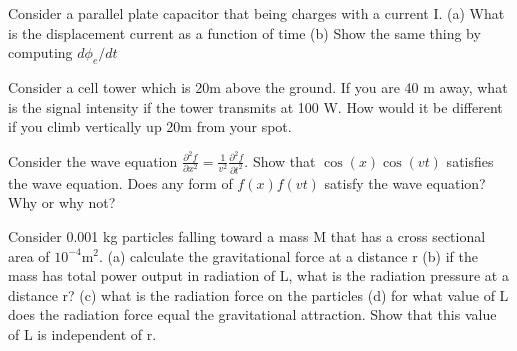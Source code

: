 \documentclass[12pt]{article}
\begin{document}
\pagestyle{empty}

\noindent Consider a parallel plate capacitor that being charges with a current I.  (a) What is the displacement current as a function of time (b) Show the same thing by computing $d\phi_e/dt$
\newpage

\noindent Consider a cell tower which is 20m above the ground.  If you are 40 m away, what is the signal intensity if the tower transmits at 100 W.  How would it be different if you climb vertically up 20m from your spot. 
\newpage

\noindent Consider the wave equation $\frac{\partial^2 f}{\partial x^2} = \frac 1 {v^2} \frac{\partial^2 f}{\partial t^2}$.  Show that $\cos(x)\cos(vt)$ satisfies the wave equation.  Does any form of $f(x)f(vt)$ satisfy the wave equation? Why or why not?

\newpage

\noindent Consider 0.001 kg particles falling toward a mass M that has a cross sectional area of $10^{-4} $m$^2$.  (a) calculate the gravitational force at a distance r (b) if the mass has total power output in radiation of L, what is the radiation pressure at a distance r? (c) what is the radiation force on the particles (d) for what value of L does the radiation force equal the gravitational attraction. Show that this value of L is independent of r.  
\end{document}
